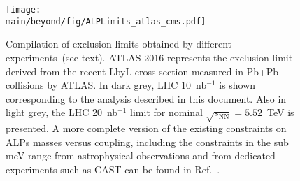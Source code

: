 \begin{figure}[!htbp]
\centering
  \texttt{[image: \\main/beyond/fig/ALPLimits\_atlas\_cms.pdf]}
  \caption{Compilation of exclusion limits obtained by different experiments~(see text).
  ATLAS 2016 represents the exclusion limit derived from the recent LbyL cross section measured in Pb+Pb collisions by ATLAS.
  In dark grey, LHC 10~nb$^{-1}$ is shown corresponding to the analysis described in this document. Also in light grey, the LHC 20~nb$^{-1}$ limit for nominal $\sqrt{s_{\mathrm{NN}}}=5.52$~TeV is presented. A more complete version of the existing constraints on ALPs masses versus coupling, including the
  constraints in the sub meV range from astrophysical observations and
  from dedicated experiments such as CAST can be found in Ref.~\cite{Bauer:2017ris}.}
  \label{fig:alp-lambda-limits}
\end{figure}

